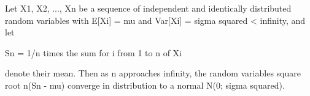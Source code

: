\documentclass{article}
\begin{document}

Let X1, X2, ..., Xn be a sequence of independent and
identically distributed random variables with
E[Xi] = mu and Var[Xi] = sigma squared < infinity, 
and let

Sn = 1/n times the sum for i from 1 to n of Xi

denote their mean. Then as n approaches infinity, the
random variables square root n(Sn - mu) converge in
distribution to a normal N(0; sigma squared).

\end{document}
